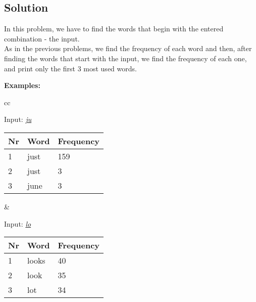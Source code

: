 \documentclass{article}
\begin{document}
      \vspace{2em}

    \subsection{Solution}
      In this problem, we have to find the words that begin with the entered
      combination - the input.\\
      As in the previous problems, we find the frequency of each word and then,
      after finding the words that start with the input, we find the frequency
      of each one, and print only the first 3 most used words.

      \vspace{1em}

      \centerline{\textbf{Examples:}}

      \vspace{2em}

        \begin{tabular}{cc}
          \begin{minipage}{.5\linewidth}
            \hspace{4em}Input: \emph{\underline{ju}}\\
            \begin{tabular}{l|l|l}
              Nr & Word & Frequency \\ \hline
              1 & just & 159 \\ \hline
              2 & just & 3 \\ \hline
              3 & june & 3 \\
            \end{tabular}
          \end{minipage} &

          \begin{minipage}{.5\linewidth}
            \hspace{4em}Input: \emph{\underline{lo}}\\
            \begin{tabular}{l|l|l}
              Nr & Word & Frequency \\ \hline
              1 & looks & 40 \\ \hline
              2 & look & 35 \\ \hline
              3 & lot & 34 \\
            \end{tabular}
          \end{minipage}
        \end{tabular}
\end{document}
